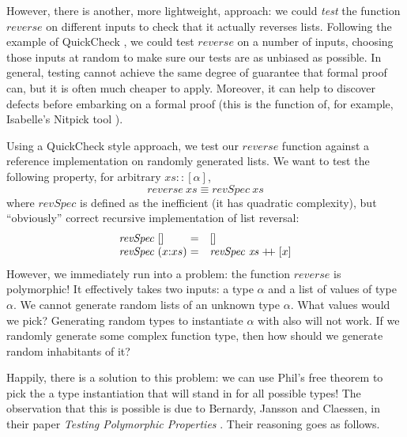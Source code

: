 \documentclass{llncs}
\newcommand{\listappend}{\mathrel{+\kern-3pt+}}
\begin{document}
However, there is another, more lightweight, approach: we could
\emph{test} the function $\mathit{reverse}$ on different inputs to
check that it actually reverses lists. Following the example of
QuickCheck \cite{DBLP:conf/icfp/ClaessenH00}, we could test
$\mathit{reverse}$ on a number of inputs, choosing those inputs at
random to make sure our tests are as unbiased as possible. In general,
testing cannot achieve the same degree of guarantee that formal proof
can, but it is often much cheaper to apply. Moreover, it can help to
discover defects before embarking on a formal proof (this is the
function of, for example, Isabelle's Nitpick tool
\cite{DBLP:conf/itp/BlanchetteN10}).

Using a QuickCheck style approach, we test our $\mathit{reverse}$
function against a reference implementation on randomly generated
lists. We want to test the following property, for arbitrary
$\mathit{xs} :: [\alpha]$,
\begin{equation}\label{eq:reverse-test}
  \mathit{reverse}~\mathit{xs} \equiv \mathit{revSpec}~\mathit{xs}
\end{equation}
where $\mathit{revSpec}$ is defined as the inefficient (it has
quadratic complexity), but ``obviously'' correct recursive
implementation of list reversal:
\begin{displaymath}
  \begin{array}{l@{\hspace{0.3em}}l@{\hspace{0.3em}}cl}
    \mathit{revSpec}& [] & = & [] \\
    \mathit{revSpec}& (x\mathord:xs) & = & \mathit{revSpec}~\mathit{xs} \listappend [x]
  \end{array}
\end{displaymath}
However, we immediately run into a problem: the function
$\mathit{reverse}$ is polymorphic! It effectively takes two inputs: a
type $\alpha$ and a list of values of type $\alpha$. We cannot
generate random lists of an unknown type $\alpha$. What values would
we pick? Generating random types to instantiate $\alpha$ with also
will not work. If we randomly generate some complex function type,
then how should we generate random inhabitants of it?

Happily, there is a solution to this problem: we can use Phil's free
theorem to pick the a type instantiation that will stand in for all
possible types! The observation that this is possible is due to
Bernardy, Jansson and Claessen, in their paper \emph{Testing
  Polymorphic Properties} \cite{DBLP:conf/esop/BernardyJC10}. Their
reasoning goes as follows.
\end{document}
